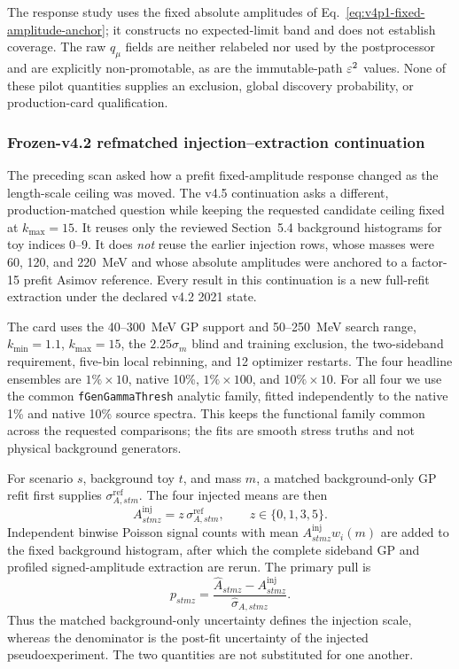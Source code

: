 {The response study uses the fixed absolute amplitudes of
Eq.~\eqref{eq:v4p1-fixed-amplitude-anchor}; it constructs no expected-limit band and
does not establish coverage. The raw $q_\mu$ fields are neither relabeled nor used by
the postprocessor and are explicitly non-promotable, as are the immutable-path
$\varepsilon^2$ values. None of these pilot quantities supplies an exclusion, global
discovery probability, or production-card qualification.

\subsubsection{Frozen-v4.2 refmatched injection--extraction continuation}
\label{sec:v4p5-exposure-refmatched-continuation}

The preceding scan asked how a prefit fixed-amplitude response changed as the
length-scale ceiling was moved.  The v4.5 continuation asks a different,
production-matched question while keeping the requested candidate ceiling fixed at
$k_{\max}=15$.  It reuses only the reviewed Section~5.4 background histograms for
toy indices 0--9.  It does \emph{not} reuse the earlier injection rows, whose masses
were 60, 120, and 220~MeV and whose absolute amplitudes were anchored to a
factor-15 prefit Asimov reference.  Every result in this continuation is a new
full-refit extraction under the declared v4.2 2021 state.

The card uses the 40--300~MeV GP support and 50--250~MeV search range,
$k_{\min}=1.1$, $k_{\max}=15$, the $2.25\sigma_m$ blind and training exclusion,
the two-sideband requirement, five-bin local rebinning, and 12 optimizer restarts.
The four headline ensembles are $1\%\times10$, native 10\%, $1\%\times100$,
and $10\%\times10$.  For all four we use the common
\texttt{fGenGammaThresh} analytic family, fitted independently to the native 1\%
and native 10\% source spectra.  This keeps the functional family common across
the requested comparisons; the fits are smooth stress truths and not physical
background generators.

For scenario $s$, background toy $t$, and mass $m$, a matched background-only GP
refit first supplies $\sigma^{\mathrm{ref}}_{A,stm}$.  The four injected means are
then
\begin{equation}
 A^{\mathrm{inj}}_{stmz}=z\,\sigma^{\mathrm{ref}}_{A,stm},
 \qquad z\in\{0,1,3,5\}.
 \label{eq:v4p5-refmatched-injection}
\end{equation}
Independent binwise Poisson signal counts with mean
$A^{\mathrm{inj}}_{stmz}w_i(m)$ are added to the fixed background histogram, after
which the complete sideband GP and profiled signed-amplitude extraction are rerun.
The primary pull is
\begin{equation}
 p_{stmz}=
 \frac{\widehat A_{stmz}-A^{\mathrm{inj}}_{stmz}}
      {\widehat\sigma_{A,stmz}}.
 \label{eq:v4p5-pull}
\end{equation}
Thus the matched background-only uncertainty defines the injection scale, whereas
the denominator is the post-fit uncertainty of the injected pseudoexperiment.  The
two quantities are not substituted for one another.

}
